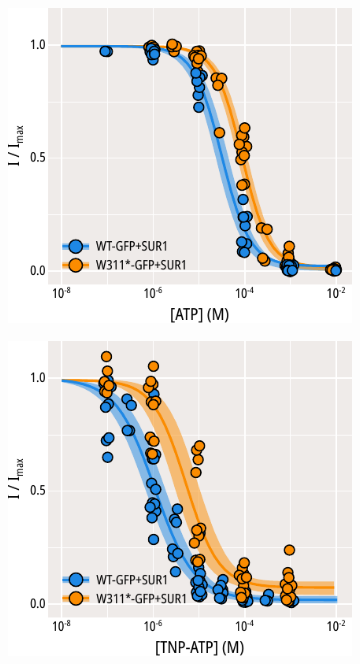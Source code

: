 \begin{figure}[hbtp]
	\centering
	\begin{subfigure}[t]{0.45\textwidth}
		\caption{}\label{ch3fig:atp_inhibition_1}
		\centering
		\includegraphics[width=\textwidth]{atp_inhibition_1.pdf}
	\end{subfigure}
	\hfill
	\begin{subfigure}[t]{0.45\textwidth}
		\caption{}\label{ch3fig:tnpatp_inhibition_1}
		\centering
		\includegraphics[width=\textwidth]{tnpatp_inhibition_1.pdf}

\end{subfigure}
\end{figure}
